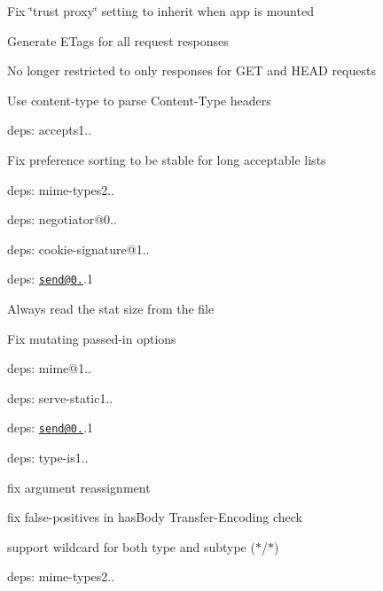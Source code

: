 {\ttfamily 
\begin{DoxyItemize}
\item Fix {\ttfamily \char`\"{}trust proxy\char`\"{}} setting to inherit when app is mounted
\item Generate {\ttfamily E\+Tag}s for all request responses
\begin{DoxyItemize}
\item No longer restricted to only responses for {\ttfamily G\+ET} and {\ttfamily H\+E\+AD} requests
\end{DoxyItemize}
\item Use {\ttfamily content-\/type} to parse {\ttfamily Content-\/\+Type} headers
\item deps\+: accepts1..
\begin{DoxyItemize}
\item Fix preference sorting to be stable for long acceptable lists
\item deps\+: mime-\/types2..
\item deps\+: negotiator@0..
\end{DoxyItemize}
\item deps\+: cookie-\/signature@1..
\item deps\+: \href{mailto:send@0.12}{\tt send@0.}.1
\begin{DoxyItemize}
\item Always read the stat size from the file
\item Fix mutating passed-\/in {\ttfamily options}
\item deps\+: mime@1..
\end{DoxyItemize}
\item deps\+: serve-\/static1..
\begin{DoxyItemize}
\item deps\+: \href{mailto:send@0.12}{\tt send@0.}.1
\end{DoxyItemize}
\item deps\+: type-\/is1..
\begin{DoxyItemize}
\item fix argument reassignment
\item fix false-\/positives in {\ttfamily has\+Body} {\ttfamily Transfer-\/\+Encoding} check
\item support wildcard for both type and subtype ({\ttfamily $\ast$/$\ast$})
\item deps\+: mime-\/types2..
\end{DoxyItemize}
\end{DoxyItemize}}

